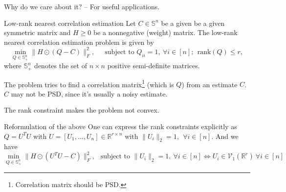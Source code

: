 \documentclass[aspectratio=43, 10pt]{beamer}
\begin{document}
   \begin{frame}[t]{Why do we care about it? -- For useful applications.}
   \vspace{-0.4cm}
        \begin{block}{Low-rank nearest correlation estimation}
        Let $C \in \mathbb{S}^n$ be a given be a given symmetric matrix and $H \geq 0 $ be a nonnegative (weight) matrix. The low-rank nearest correlation estimation problem is given by 
        $$\min_{Q \in \mathbb{S}_{+}^n} \| H \odot (Q - C)\|_F^2,~~~~~\text{ subject to  } Q_{ii}=1,~ \forall i\in [n]; ~~\text{rank}(Q) \leq r,$$
        where $\mathbb{S}_{+}^n$ denotes the set of $n \times n$ positive semi-definite matrices. 
      \end{block}

      \vspace{-0.2em}
      The problem tries to find a correlation matrix\footnote{Correlation matrix should be PSD.} (which is $Q$) from an estimate $C$. $C$ may not be PSD, since it's usually a noisy estimate. 

      The rank constraint makes the problem not convex. 
      
      \pause
      \vspace{-0.45em}
      \begin{block}{Reformulation of the above}
          One can express the rank constraints explicitly as $Q = U^T U$ with $U = [U_1,..., U_n] \in \mathbb{R}^{r \times n}$ with $\|U_i\|_2=1,~~ \forall i \in [n].$ And we have 
          \small
          $$\min_{Q \in \mathbb{S}_{+}^n} \| H \odot (U^T U - C)\|_F^2,~~\text{ subject to  } \| U_i \|_2=1,~ \forall i\in [n] \iff U_i \in \mathcal{V}_1(\mathbb{R}^r) ~\forall i\in [n]$$
      \end{block}
  \end{frame}
\end{document}
